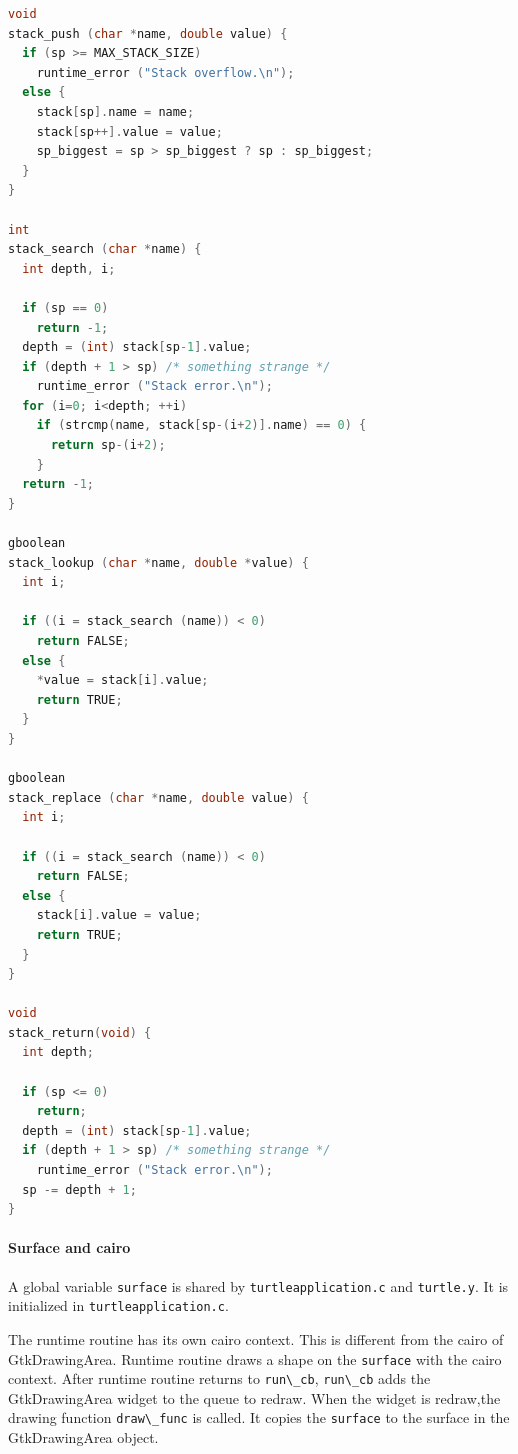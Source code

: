 \begin{lstlisting}[language=C]
void
stack_push (char *name, double value) {
  if (sp >= MAX_STACK_SIZE)
    runtime_error ("Stack overflow.\n");
  else {
    stack[sp].name = name;
    stack[sp++].value = value;
    sp_biggest = sp > sp_biggest ? sp : sp_biggest;
  }
}

int
stack_search (char *name) {
  int depth, i;

  if (sp == 0)
    return -1;
  depth = (int) stack[sp-1].value;
  if (depth + 1 > sp) /* something strange */
    runtime_error ("Stack error.\n");
  for (i=0; i<depth; ++i)
    if (strcmp(name, stack[sp-(i+2)].name) == 0) {
      return sp-(i+2);
    }
  return -1;
}

gboolean
stack_lookup (char *name, double *value) {
  int i;

  if ((i = stack_search (name)) < 0)
    return FALSE;
  else {
    *value = stack[i].value;
    return TRUE;
  }
}

gboolean
stack_replace (char *name, double value) {
  int i;

  if ((i = stack_search (name)) < 0)
    return FALSE;
  else {
    stack[i].value = value;
    return TRUE;
  }
}

void
stack_return(void) {
  int depth;

  if (sp <= 0)
    return;
  depth = (int) stack[sp-1].value;
  if (depth + 1 > sp) /* something strange */
    runtime_error ("Stack error.\n");
  sp -= depth + 1;
}
\end{lstlisting}

\hypertarget{surface-and-cairo}{%
\paragraph{Surface and cairo}\label{surface-and-cairo}}

A global variable \passthrough{\lstinline!surface!} is shared by
\passthrough{\lstinline!turtleapplication.c!} and
\passthrough{\lstinline!turtle.y!}. It is initialized in
\passthrough{\lstinline!turtleapplication.c!}.

The runtime routine has its own cairo context. This is different from
the cairo of GtkDrawingArea. Runtime routine draws a shape on the
\passthrough{\lstinline!surface!} with the cairo context. After runtime
routine returns to \passthrough{\lstinline!run\_cb!},
\passthrough{\lstinline!run\_cb!} adds the GtkDrawingArea widget to the
queue to redraw. When the widget is redraw,the drawing function
\passthrough{\lstinline!draw\_func!} is called. It copies the
\passthrough{\lstinline!surface!} to the surface in the GtkDrawingArea
object.

